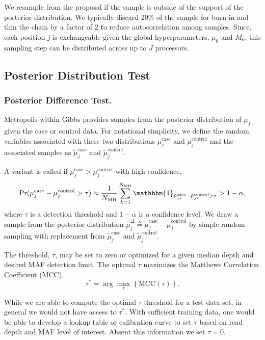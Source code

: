 \documentclass{bioinfo}
\begin{document}
We resample from the proposal if the sample is outside of the support of the posterior distribution. We typically discard 20\% of the sample for burn-in and thin the chain by a factor of 2 to reduce autocorrelation among samples. Since, each position $j$ is exchangeable given the global hyperparameters, $\mu_0$ and $M_0$, this sampling step can be distributed across up to $J$ processors.

\subsection{Posterior Distribution Test}\label{sec:hypothesis_test}
\subsubsection*{Posterior Difference Test.}
Metropolis-within-Gibbs provides samples from the posterior distribution of $\mu_j$ given the case or control data. For notational simplicity, we define the random variables associated with these two distributions $\mu_j^{\text{case}}$ and $\mu_j^{\text{control}}$ and the associated samples as $\tilde{\mu}_j^{\text{case}}$ and $\tilde{\mu}_j^{\text{control}}$.

A variant is called if $\mu_j^{\text{case}} > \mu_j^{\text{control}}$ with high confidence,
\begin{equation}\label{eqn:bayes_test}
	\Pr( \mu_j^{\text{case}} - \mu_j^{\text{control}}  > \tau ) \approx \frac{1}{N_{\text{MH}}} \sum_{k=1}^{N_{\text{MH}}} \mathbbm{1}_{\tilde{\mu}_{jk}^{\text{case}} - \tilde{\mu}_{jk}^{\text{control}} > \tau } > 1-\alpha,
\end{equation}
where $\tau$ is a detection threshold and $1-\alpha$ is a confidence level. We draw a sample from the posterior distribution $\tilde{\mu}_j^{\Delta} \triangleq \tilde{\mu}_j^{\text{case}} - \tilde{\mu}_j^{\text{control}}$ by simple random sampling with replacement from $\tilde{\mu}_j^{\text{case}}$ and $\tilde{\mu}_j^{\text{control}}$.

The threshold, $\tau$, may be set to zero or optimized for a given median depth and desired MAF detection limit. The optimal $\tau$ maximizes the Matthews Correlation Coefficient (MCC),
\begin{equation}
	\tau^* = \arg\max_\tau \left\{ \text{MCC}(\tau)\right\}.
\end{equation}

While we are able to compute the optimal $\tau$ threshold for a test data set, in general we would not have access to $\tau^*$. With sufficient training data, one would be able to develop a lookup table or calibration curve to set $\tau$ based on read depth and MAF level of interest. Absent this information we set $\tau = 0$.
\end{document}
